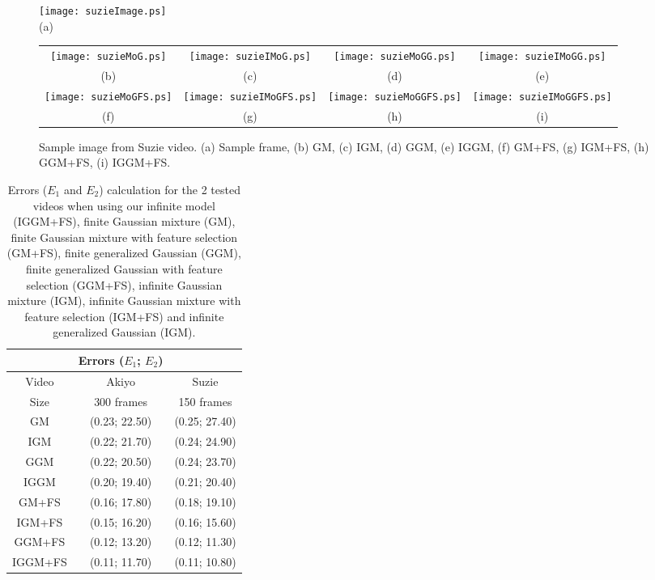 \documentclass[journal,10pt]{elsart}
\begin{document}
\begin{figure*}
\begin{center}
\texttt{[image: suzieImage.ps]}\\
(a)
\end{center}
\begin{center}
\begin{tabular}{cccc}
 \texttt{[image: suzieMoG.ps]}
&
\texttt{[image: suzieIMoG.ps]}
&
\texttt{[image: suzieMoGG.ps]}
&
\texttt{[image: suzieIMoGG.ps]}
\\
(b)&(c)&(d)&(e)
\\
 \texttt{[image: suzieMoGFS.ps]}
&
\texttt{[image: suzieIMoGFS.ps]}
&
\texttt{[image: suzieMoGGFS.ps]}
&
\texttt{[image: suzieIMoGGFS.ps]}
\\
(f)&(g)&(h)&(i)
\end{tabular}
\caption{Sample image from Suzie video. (a) Sample frame, (b) GM, (c) IGM, (d) GGM, (e) IGGM, (f) GM+FS, (g) IGM+FS, (h) GGM+FS, (i) IGGM+FS.} \label{video3}
\end{center}
\end{figure*}
\begin{table}[ht!]
\begin{center}
\caption{Errors ($E_1$ and $E_2$) calculation for the 2 tested videos when using our infinite model (IGGM+FS), finite Gaussian mixture (GM), finite Gaussian mixture with feature selection (GM+FS), finite generalized Gaussian (GGM), finite generalized Gaussian with feature selection (GGM+FS), infinite Gaussian mixture (IGM), infinite Gaussian mixture with feature selection (IGM+FS) and infinite generalized Gaussian (IGM). \label{tab3}}
  \small
\begin{tabular}{|ccc|}
  \hline
  &Errors ($E_1$; $E_2$)&\\
  \hline
Video&Akiyo&Suzie\\
\hline
Size&300 frames&150 frames\\
\hline
GM&(0.23; 22.50)&(0.25; 27.40)\\
IGM&(0.22; 21.70)&(0.24; 24.90)\\
GGM&(0.22; 20.50)&(0.24; 23.70)\\
IGGM&(0.20; 19.40)&(0.21; 20.40)\\
GM+FS&(0.16; 17.80)&(0.18; 19.10)\\
IGM+FS&(0.15; 16.20)&(0.16; 15.60)\\
GGM+FS&(0.12; 13.20)&(0.12; 11.30)\\
IGGM+FS&(0.11; 11.70)&(0.11; 10.80)\\
  \hline
\end{tabular}
\end{center}
\end{table}
\end{document}
